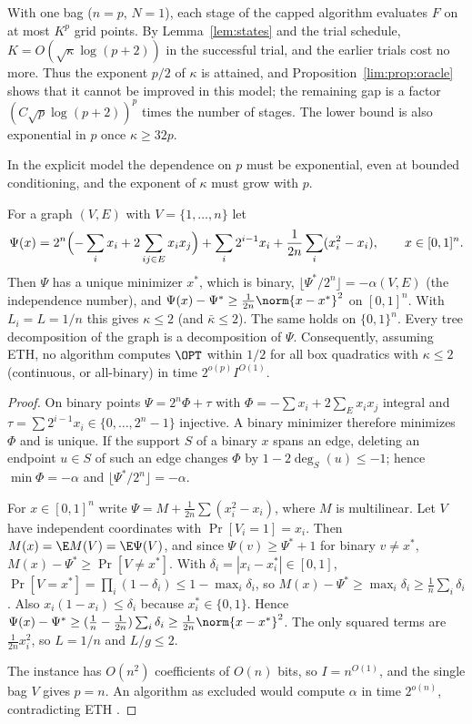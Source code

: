 \begin{remark}
\label{lim:rem:oracle}
With one bag ($n=p$, $N=1$), each stage of the capped algorithm evaluates
$F$ on at most $K^p$ grid points. By Lemma~\ref{lem:states} and the
trial schedule, $K=O(\sqrt\kappa\log(p+2))$ in the successful trial, and
the earlier trials cost no more. Thus the exponent $p/2$ of $\kappa$ is
attained, and Proposition~\ref{lim:prop:oracle} shows that it cannot be
improved in this model; the remaining gap is a factor
$(C\sqrt p\log(p+2))^p$ times the number of stages. The lower bound is also
exponential in $p$ once $\kappa\ge32p$.
\end{remark}

In the explicit model the dependence on $p$ must be exponential, even at
bounded conditioning, and the exponent of $\kappa$ must grow with $p$.

\begin{proposition}
\label{prop:lbwidth}
For a graph $(V,E)$ with $V=\{1,\dots,n\}$ let
\[
\Psi(x)=2^n\Bigl(-\sum_ix_i+2\sum_{ij\in E}x_ix_j\Bigr)+\sum_i2^{i-1}x_i
+\frac1{2n}\sum_i(x_i^2-x_i),\qquad x\in[0,1]^n .
\]
Then $\Psi$ has a unique minimizer $x^*$, which is binary,
$\lfloor\Psi^*/2^n\rfloor=-\alpha(V,E)$ (the independence number), and
$\Psi(x)-\Psi^*\ge\frac1{2n}\norm{x-x^*}^2$ on $[0,1]^n$. With
$L_i=L=1/n$ this gives $\kappa\le2$ (and $\bar\kappa\le2$). The same holds on
$\{0,1\}^n$. Every tree decomposition of the graph is a decomposition of
$\Psi$. Consequently, assuming ETH, no algorithm computes $\OPT$ within $1/2$
for all box quadratics with $\kappa\le2$ (continuous, or all-binary) in time
$2^{o(p)}I^{O(1)}$.
\end{proposition}

\begin{proof}
On binary points $\Psi=2^n\Phi+\tau$ with $\Phi=-\sum x_i+2\sum_Ex_ix_j$
integral and $\tau=\sum2^{i-1}x_i\in\{0,\dots,2^n-1\}$ injective. A binary
minimizer therefore minimizes $\Phi$ and is unique. If the support $S$ of a
binary $x$ spans an edge, deleting an endpoint $u\in S$ of such an edge changes
$\Phi$ by $1-2\deg_S(u)\le-1$; hence $\min\Phi=-\alpha$ and
$\lfloor\Psi^*/2^n\rfloor=-\alpha$.

For $x\in[0,1]^n$ write $\Psi=M+\frac1{2n}\sum(x_i^2-x_i)$, where $M$ is
multilinear. Let $V$ have independent coordinates with $\Pr[V_i=1]=x_i$. Then
$M(x)=\E M(V)=\E\Psi(V)$, and since $\Psi(v)\ge\Psi^*+1$ for binary
$v\ne x^*$, $M(x)-\Psi^*\ge\Pr[V\ne x^*]$. With
$\delta_i=|x_i-x_i^*|\in[0,1]$,
$\Pr[V=x^*]=\prod_i(1-\delta_i)\le1-\max_i\delta_i$, so
$M(x)-\Psi^*\ge\max_i\delta_i\ge\frac1n\sum_i\delta_i$. Also
$x_i(1-x_i)\le\delta_i$ because $x_i^*\in\{0,1\}$. Hence
$\Psi(x)-\Psi^*\ge(\frac1n-\frac1{2n})\sum_i\delta_i\ge\frac1{2n}\norm{x-x^*}^2$.
The only squared terms are $\frac1{2n}x_i^2$, so $L=1/n$ and $L/g\le2$.

The instance has $O(n^2)$ coefficients of $O(n)$ bits, so $I=n^{O(1)}$, and
the single bag $V$ gives $p=n$. An algorithm as excluded would compute
$\alpha$ in time $2^{o(n)}$, contradicting ETH
\cite{ImpagliazzoPaturiZane2001}.
\end{proof}

